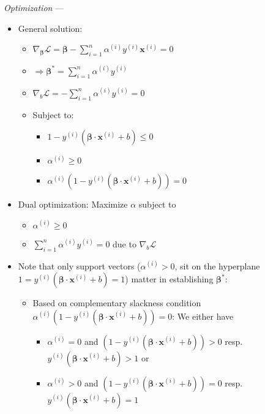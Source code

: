 \emph{Optimization} ---
\begin{itemize}
    \item General solution:
    \begin{itemize}
        \item $\nabla_{\boldsymbol{\beta}} \mathcal{L} =  \boldsymbol{\beta} - \sum_{i=1}^n \alpha^{(i)} y^{(i)} \boldsymbol{x}^{(i)} = 0$
        \item $\Rightarrow \boldsymbol{\beta}^{*} = \sum_{i=1}^n \alpha^{(i)} y^{(i)}$
        \item $\nabla_b \mathcal{L} = - \sum_{i=1}^n \alpha^{(i)} y^{(i)} = 0$
        \item Subject to:
        \begin{itemize}
            \item $1 - y^{(i)} (\boldsymbol{\beta} \cdot \boldsymbol{x}^{(i)} + b) \leq 0$
            \item $\alpha^{(i)} \geq 0$
            \item $\alpha^{(i)} (1 - y^{(i)} (\boldsymbol{\beta} \cdot \boldsymbol{x}^{(i)} + b)) = 0$
        \end{itemize}
    \end{itemize}
    \item Dual optimization: Maximize $\alpha$ subject to 
    \begin{itemize}
        \item $\alpha^{(i)} \geq 0$ 
        \item $\sum_{i=1}^n \alpha^{(i)} y^{(i)} = 0$ due to $\nabla_b \mathcal{L}$
    \end{itemize}
    \item Note that only support vectors ($\alpha^{(i)} > 0$, sit on the hyperplane $ 1 = y^{(i)} (\boldsymbol{\beta} \cdot \boldsymbol{x}^{(i)} + b) = 1$) matter in establishing $\boldsymbol{\beta}^{*}$:
    \begin{itemize}
        \item Based on complementary slackness condition $\alpha^{(i)} (1 - y^{(i)} (\boldsymbol{\beta} \cdot \boldsymbol{x}^{(i)} + b)) = 0$: We either have 
        \begin{itemize}
            \item $\alpha^{(i)} = 0$ and $ (1 - y^{(i)} (\boldsymbol{\beta} \cdot \boldsymbol{x}^{(i)} + b)) > 0$ resp.$ y^{(i)} (\boldsymbol{\beta} \cdot \boldsymbol{x}^{(i)} + b) > 1$ or
            \item $\alpha^{(i)} > 0$ and $ (1 - y^{(i)} (\boldsymbol{\beta} \cdot \boldsymbol{x}^{(i)} + b)) = 0$ resp.$ y^{(i)} (\boldsymbol{\beta} \cdot \boldsymbol{x}^{(i)} + b) = 1$ 
        \end{itemize}
    \end{itemize}
\end{itemize}

